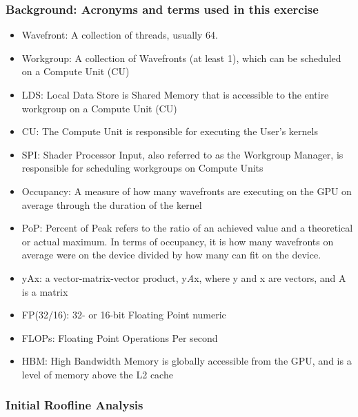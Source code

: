 \documentclass[
]{article}
\begin{document}
\subsubsection*{Background: Acronyms and terms used in this exercise}
\begin{itemize}
\item Wavefront: A collection of threads, usually 64.

\item Workgroup: A collection of Wavefronts (at least 1), which can be
scheduled on a Compute Unit (CU)

\item LDS: Local Data Store is Shared Memory that is accessible to the entire
workgroup on a Compute Unit (CU)

\item CU: The Compute Unit is responsible for executing the User's kernels

\item SPI: Shader Processor Input, also referred to as the Workgroup Manager,
is responsible for scheduling workgroups on Compute Units

\item Occupancy: A measure of how many wavefronts are executing on the GPU on average through the duration of the kernel

\item PoP: Percent of Peak refers to the ratio of an achieved value and a
theoretical or actual maximum. In terms of occupancy, it is how many
wavefronts on average were on the device divided by how many can fit on
the device.

\item yAx: a vector-matrix-vector product, y\emph{A}x, where y and x are
vectors, and A is a matrix

\item FP(32/16): 32- or 16-bit Floating Point numeric 

\item FLOPs: Floating Point Operations Per second

\item HBM: High Bandwidth Memory is globally accessible from the GPU, and is a level of memory above the L2 cache
 
\end{itemize}

\hypertarget{initial-roofline-analysis2}{%
\subsubsection{Initial Roofline
Analysis}\label{initial-roofline-analysis2}}
\end{document}
